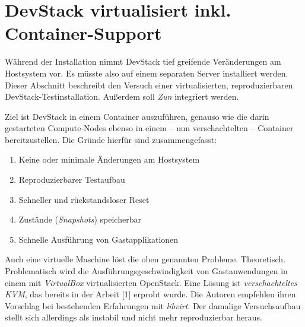 \section{DevStack virtualisiert inkl. Container-Support}

Während der Installation nimmt DevStack tief greifende Veränderungen am Hostsystem vor. Es müsste also auf einem separaten Server installiert werden. Dieser Abschnitt beschreibt den Versuch einer virtualisierten, reproduzierbaren DevStack-Testinstallation. Außerdem soll \emph{Zun} integriert werden. 

Ziel ist DevStack in einem Container auszuführen, genauso wie die darin gestarteten Compute-Nodes ebenso in einem -- nun verschachtelten -- Container bereitzustellen. Die Gründe hierfür sind zusammengefasst:

\begin{enumerate}
	\item Keine oder minimale Änderungen am Hostsystem
	\item Reproduzierbarer Testaufbau
	\item Schneller und rückstandsloser Reset
	\item Zustände (\emph{Snapshots}) speicherbar
	\item Schnelle Ausführung von Gastapplikationen
\end{enumerate}

\noindent Auch eine virtuelle Maschine löst die oben genannten Probleme. Theoretisch. Problematisch wird die Ausführungsgeschwindigkeit von Gastanwendungen in einem mit \emph{VirtualBox} virtualisierten OpenStack. Eine Lösung ist \emph{verschachteltes KVM}, das bereits in der Arbeit [1] erprobt wurde. Die Autoren empfehlen ihren Vorschlag bei bestehenden Erfahrungen mit \emph{libvirt}. Der damalige Versuchsaufbau stellt sich allerdings als instabil und nicht mehr reproduzierbar heraus.

